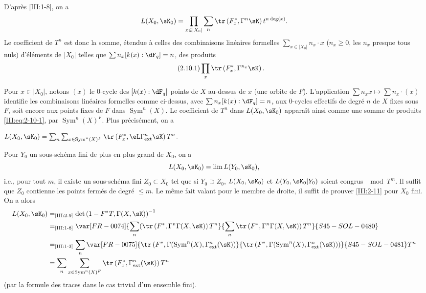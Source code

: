 D'après \ref{III:1-8}, on a 
\[
  L(X_0,\sK_0) = \prod_{x\in |X_0|} \sum_n \tr\left(F_x^*,\Gamma^n\sK\right) t^{n\deg(x)} \text{.}
\]
Le coefficient de $T^n$ est donc la somme, étendue à celles des 
combinaisons linéaires formelles $\sum_{x\in |X_0|} n_x\cdot x$ 
($n_x\geqslant 0$, les $n_x$ presque tous nuls) d'éléments de $|X_0|$ 
telles que $\sum n_x [k(x):\dF_q] = n$, des produits 
\begin{equation*}\tag{2.10.1}\label{III:eq:2-10-1}
  \prod_x \tr\left(F_x^*,\Gamma^{n_x} \sK\right) \text{.}
\end{equation*}

Pour $x\in |X_0|$, notons $(x)$ le $0$-cycle des $[k(x):\dF_q]$ points de $X$ 
au-dessus de $x$ (une orbite de $F$). L'application 
$\sum n_x x\mapsto \sum n_x\cdot (x)$ identifie les combinaisons linéaires 
formelles comme ci-dessus, avec $\sum n_x [k(x):\dF_q]=n$, aux $0$-cycles 
effectifs de degré $n$ de $X$ fixes sous $F$, soit encore aux points fixes de 
$F$ dans $\operatorname{Sym}^n(X)$. Le coefficient de $T^n$ dans $L(X_0,\sK_0)$ 
apparaît ainsi comme une somme de produits \eqref{III:eq:2-10-1},  
par $\operatorname{Sym}^n(X)^F$. Plus précisément, on a 





\begin{lemma_}\label{III:2-11}
 $L(X_0,\sK_0) = \sum_n \sum_{x\in\operatorname{Sym}^n(X)^F} \tr\left(F_x^*,\eL\Gamma_\textnormal{ext}^n \sK\right) T^n$.
\end{lemma_}

Pour $Y_0$ un sous-schéma fini de plus en plus grand de $X_0$, on a 
\[
  L(X_0,\sK_0) = \lim L(Y_0,\sK_0) \text{,}
\]
i.e., pour tout $m$, il existe un sous-schéma fini $Z_0\subset X_0$ tel que 
si $Y_0\supset Z_0$, $L(X_0,\sK_0)$ et $L(Y_0,\sK_0|Y_0)$ soient congrus 
$\mod T^m$. 
Il suffit que $Z_0$ contienne les points fermés de degré $\leqslant m$. 
Le même fait valant pour le membre de droite, il suffit de prouver 
\ref{III:2-11} pour $X_0$ fini. On a alors 
\begin{align*}
  L(X_0,\sK_0) 
    &=_\text{\ref{III:2-9}} \det\left(1-F^* T,\Gamma(X,\sK)\right)^{-1} \\
    &=_\text{\ref{III:1-8}} \var[FR-0074]{\sum_n (\tr\left(F^*,\Gamma^n \Gamma(X,\sK)\right) T^n}{\sum_n \tr\left(F^*,\Gamma^n \Gamma(X,\sK)\right) T^n}{S45-SOL-0480} \\
    &=_\text{\ref{III:1-3}} \sum_n \var[FR-0075]{\tr\left(F^*,\Gamma(\operatorname{Sym}^n(X),\Gamma_\text{ext}^n(\sK)\right)}{\tr\left(F^*,\Gamma(\operatorname{Sym}^n(X),\Gamma_\text{ext}^n(\sK))\right)}{S45-SOL-0481} T^n \\
    &= \sum_n \sum_{x\in \operatorname{Sym}^n(X)^F} \tr\left(F_x^*,\Gamma_\text{ext}^n(\sK)\right) T^n
\end{align*}
(par la formule des traces dans le cas trivial d'un ensemble fini). 





